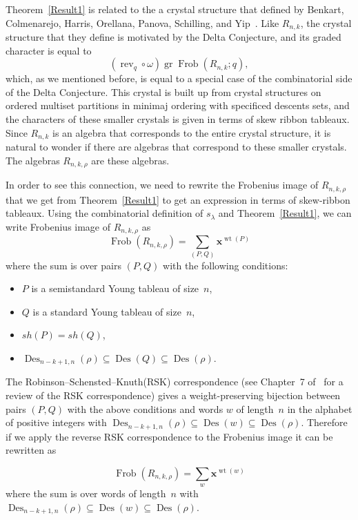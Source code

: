 \documentclass[ALCO,ThmDefs,Unicode,epreuves]{cedram}
\DeclareMathOperator{\Frob}{Frob}
\DeclareMathOperator{\gr}{gr}
\DeclareMathOperator{\Des}{Des}
\DeclareMathOperator{\wt}{wt}
\DeclareMathOperator{\rev}{rev}
\begin{document}
Theorem~\ref{Result1} is related to the a crystal structure that defined by Benkart, Colmenarejo, Harris, Orellana, Panova, 
Schilling, and Yip~\cite{Sh}. Like $R_{n,k}$, the crystal structure that they define is motivated by the Delta Conjecture, and 
its graded character is equal to 
\begin{equation}
(\rev _q\circ \omega) \gr\Frob (R_{n,k};q),
\end{equation}
 which, as we 
mentioned before, is equal to a special case of the combinatorial side of the Delta Conjecture. This crystal is built up from 
crystal structures on ordered multiset partitions in minimaj ordering with specificed descents sets, and the characters of 
these smaller crystals is given in terms of skew ribbon tableaux. Since $R_{n,k}$ is an algebra that corresponds to the entire 
crystal structure, it is natural to wonder if there are algebras that correspond to these smaller crystals. The algebras 
$R_{n,k,\rho}$ are these algebras.


In order to see this connection, we need to rewrite the Frobenius image of $R_{n,k,\rho}$ that we get from Theorem~\ref{Result1} to get an expression in terms of skew-ribbon tableaux. Using the combinatorial definition of $s_\lambda$ and 
Theorem~\ref{Result1}, we can write Frobenius image of $R_{n,k,\rho}$ as 
\begin{equation}
\Frob (R_{n,k,\rho})=\sum_{(P,Q)} \mathbf{x}^{\wt (P)}
\end{equation}
 where the sum is over pairs $(P,Q)$ 
with the following conditions:
\begin{itemize}
\item $P$ is a semistandard Young tableau of size~$n$,
\item $Q$ is a standard Young tableau of size~$n$,
\item $sh(P)=sh(Q)$,
\item $\Des _{n-k+1,n}(\rho)\subseteq \Des (Q)\subseteq \Des (\rho)$.
\end{itemize} 

The Robinson--Schensted--Knuth(RSK) correspondence (see Chapter~7 of~\cite{St} for a review of the RSK correspondence) gives a 
weight-preserving bijection between pairs $(P,Q)$ with the above conditions and words $w$ of length~$n$ in the alphabet of 
positive integers with $\Des _{n-k+1,n}(\rho)\subseteq \Des (w)\subseteq \Des (\rho)$. Therefore if we apply the reverse RSK 
correspondence to the Frobenius image it can be rewritten as
 
\begin{equation}
\Frob (R_{n,k,\rho})=\sum_{w} \mathbf{x}^{\wt (w)}
\end{equation}
 where the sum is over words of length~$n$ 
with $\Des _{n-k+1,n}(\rho)\subseteq \Des (w)\subseteq \Des (\rho)$.
\end{document}
